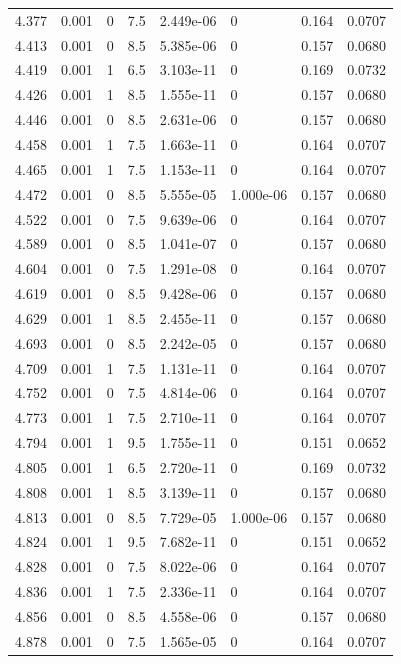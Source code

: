 \documentclass[preview]{standalone}
\begin{document}
{{{{{\begin{tabular}{L{1.2cm}C{1.2cm} C{0.3cm}C{0.5cm} C{1.4cm}C{1.4cm} C{1.4cm}C{1.4cm}}
  4.377  &  0.001  & 0     & 7.5 &  2.449e-06  & 0  & 0.164 &  0.0707   \\ 
  4.413  &  0.001  & 0     & 8.5 &  5.385e-06  & 0  & 0.157 &  0.0680   \\ 
  4.419  &  0.001  & 1     & 6.5 &  3.103e-11  & 0  & 0.169 &  0.0732   \\ 
  4.426  &  0.001  & 1     & 8.5 &  1.555e-11  & 0  & 0.157 &  0.0680   \\ 
  4.446  &  0.001  & 0     & 8.5 &  2.631e-06  & 0  & 0.157 &  0.0680   \\ 
  4.458  &  0.001  & 1     & 7.5 &  1.663e-11  & 0  & 0.164 &  0.0707   \\ 
  4.465  &  0.001  & 1     & 7.5 &  1.153e-11  & 0  & 0.164 &  0.0707   \\ 
  4.472  &  0.001  & 0     & 8.5 &  5.555e-05  & 1.000e-06  & 0.157 &  0.0680   \\ 
  4.522  &  0.001  & 0     & 7.5 &  9.639e-06  & 0  & 0.164 &  0.0707   \\ 
  4.589  &  0.001  & 0     & 8.5 &  1.041e-07  & 0  & 0.157 &  0.0680   \\ 
  4.604  &  0.001  & 0     & 7.5 &  1.291e-08  & 0  & 0.164 &  0.0707   \\ 
  4.619  &  0.001  & 0     & 8.5 &  9.428e-06  & 0  & 0.157 &  0.0680   \\ 
  4.629  &  0.001  & 1     & 8.5 &  2.455e-11  & 0  & 0.157 &  0.0680   \\ 
  4.693  &  0.001  & 0     & 8.5 &  2.242e-05  & 0  & 0.157 &  0.0680   \\ 
  4.709  &  0.001  & 1     & 7.5 &  1.131e-11  & 0  & 0.164 &  0.0707   \\ 
  4.752  &  0.001  & 0     & 7.5 &  4.814e-06  & 0  & 0.164 &  0.0707   \\ 
  4.773  &  0.001  & 1     & 7.5 &  2.710e-11  & 0  & 0.164 &  0.0707   \\ 
  4.794  &  0.001  & 1     & 9.5 &  1.755e-11  & 0  & 0.151 &  0.0652   \\ 
  4.805  &  0.001  & 1     & 6.5 &  2.720e-11  & 0  & 0.169 &  0.0732   \\ 
  4.808  &  0.001  & 1     & 8.5 &  3.139e-11  & 0  & 0.157 &  0.0680   \\ 
  4.813  &  0.001  & 0     & 8.5 &  7.729e-05  & 1.000e-06  & 0.157 &  0.0680   \\ 
  4.824  &  0.001  & 1     & 9.5 &  7.682e-11  & 0  & 0.151 &  0.0652   \\ 
  4.828  &  0.001  & 0     & 7.5 &  8.022e-06  & 0  & 0.164 &  0.0707   \\ 
  4.836  &  0.001  & 1     & 7.5 &  2.336e-11  & 0  & 0.164 &  0.0707   \\ 
  4.856  &  0.001  & 0     & 8.5 &  4.558e-06  & 0  & 0.157 &  0.0680   \\ 
  4.878  &  0.001  & 0     & 7.5 &  1.565e-05  & 0  & 0.164 &  0.0707   \\ 
\hline 
\end{tabular} 

}}}}}
\end{document}
